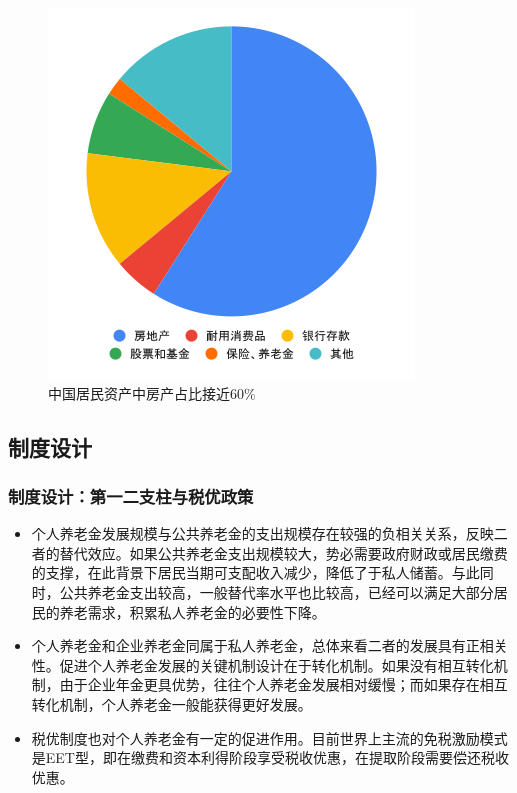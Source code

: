 \documentclass[a4paper,zihao=5]{ctexbeamer}
\begin{document}
\begin{frame}
\begin{figure}[H]
\begin{minipage}{0.48\linewidth}
            \centering
            \includegraphics[width=0.75\linewidth]{img/cn.png}
            \caption{中国居民资产中房产占比接近60\%}
        \end{minipage}
    \end{figure}

\end{frame}






\subsection{制度设计}
\begin{frame}
    \frametitle{制度设计：第一二支柱与税优政策}
    \begin{itemize}
        \item 个人养老金发展规模与公共养老金的支出规模存在较强的负相关关系，反映二者的替代效应。如果公共养老金支出规模较大，势必需要政府财政或居民缴费的支撑，在此背景下居民当期可支配收入减少，降低了于私人储蓄。与此同时，公共养老金支出较高，一般替代率水平也比较高，已经可以满足大部分居民的养老需求，积累私人养老金的必要性下降。
        \item 个人养老金和企业养老金同属于私人养老金，总体来看二者的发展具有正相关性。促进个人养老金发展的关键机制设计在于转化机制。如果没有相互转化机制，由于企业年金更具优势，往往个人养老金发展相对缓慢；而如果存在相互转化机制，个人养老金一般能获得更好发展。
        \item 税优制度也对个人养老金有一定的促进作用。目前世界上主流的免税激励模式是EET型，即在缴费和资本利得阶段享受税收优惠，在提取阶段需要偿还税收优惠。
    \end{itemize}
\end{frame}
\end{document}

